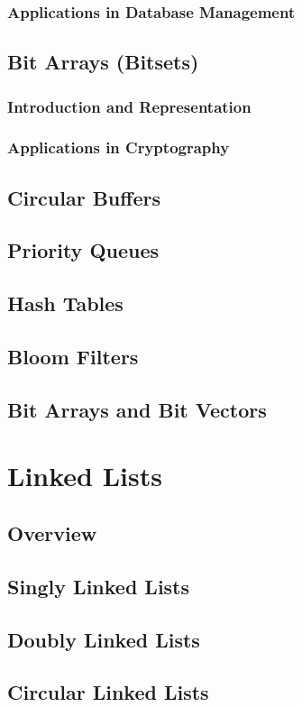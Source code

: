 \documentclass[12pt, oneside]{book}
\begin{document}
	\subsection{Applications in Database Management}
	
	\section{Bit Arrays (Bitsets)}
	\subsection{Introduction and Representation}
	\subsection{Applications in Cryptography}
	\section{Circular Buffers}
	\section{Priority Queues}
	\section{Hash Tables}
	\section{Bloom Filters}
	\section{Bit Arrays and Bit Vectors}
	
	\chapter{Linked Lists}
	\section{Overview}
	\section{Singly Linked Lists}
	\section{Doubly Linked Lists}
	\section{Circular Linked Lists}
\end{document}
